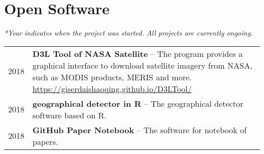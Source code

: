 \section*{Open Software}

\textit{*Year indicates when the project was started. All projects are currently ongoing.}

\begin{tabular}{p{} p{}}
2018 & \textbf{D3L Tool of NASA Satellite} -- The program provides a graphical interface to download satellite imagery from NASA, such as MODIS products, MERIS and more. \newline
       \url{https://giserdaishaoqing.github.io/D3LTool/} \\
2018 & \textbf{geographical detector in R} -- The geographical detector software based on R.\\
2018 & \textbf{GitHub Paper Notebook} -- The software for notebook of papers.\\
\end{tabular}
